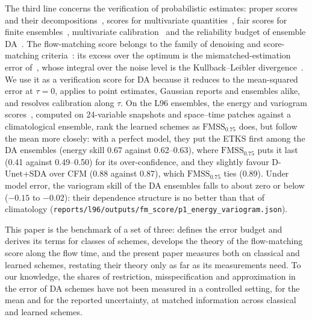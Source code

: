 The third line concerns the verification of probabilistic estimates: proper scores and their
decompositions~\cite{gneiting_strictly_2007,brocker_reliability_2009}, scores for multivariate
quantities~\cite{gneiting_assessing_2008,scheuerer_variogram-based_2015}, fair scores for finite
ensembles~\cite{ferro_fair_2014}, multivariate calibration~\cite{allen_assessing_2024} and the
reliability budget of ensemble DA~\cite{rodwell_reliability_2016}. The flow-matching score
belongs to the family of denoising and score-matching
criteria~\cite{hyvarinen_estimation_2005,vincent_connection_2011,parry_proper_2012}: its excess
over the optimum is the mismatched-estimation error of~\cite{verdu_mismatched_2010}, whose
integral over the noise level is the Kullback--Leibler
divergence~\cite{guo_mutual_2005,verdu_mismatched_2010}. We use it as a verification score for
DA because it reduces to the mean-squared error at $\tau = 0$, applies to point estimates,
Gaussian reports and ensembles alike, and resolves calibration along $\tau$. On the L96 ensembles,
the energy and variogram scores~\cite{gneiting_assessing_2008,scheuerer_variogram-based_2015}, computed
on 24-variable snapshots and space--time patches against a climatological ensemble, rank the learned
schemes as $\mathrm{FMSS}_{0.75}$ does, but follow the mean more closely: with a perfect model, they put
the ETKS first among the DA ensembles (energy skill 0.67 against 0.62--0.63), where
$\mathrm{FMSS}_{0.75}$ puts it last (0.41 against 0.49--0.50) for its over-confidence, and they
slightly favour D-Unet+SDA over CFM (0.88 against 0.87), which $\mathrm{FMSS}_{0.75}$ ties (0.89).
Under model error, the variogram skill of the DA ensembles falls to about zero or below ($-0.15$ to
$-0.02$): their dependence structure is no better than that of climatology
(\texttt{reports/l96/outputs/fm\_score/p1\_energy\_variogram.json}).

This paper is the benchmark of a set of three: \cite{fablet_not_2026} defines the error budget
and derives its terms for classes of schemes, \cite{fablet_flow_2026} develops the theory of the
flow-matching score along the flow time, and the present paper measures both on classical and
learned schemes, restating their theory only as far as its measurements need. To our knowledge,
the shares of restriction, misspecification and approximation in the error of DA schemes have
not been measured in a controlled setting, for the mean and for the reported uncertainty, at
matched information across classical and learned schemes.

